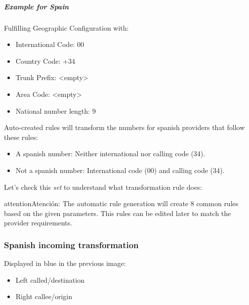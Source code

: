 \documentclass[letterpaper,10pt,spanish]{sphinxmanual}
\begin{document}
\subparagraph{Example for Spain}
\label{administration_portal/brand/settings/numeric_transformations:example-for-spain}
Fulfilling Geographic Configuration with:
\begin{itemize}
\item {} 
International Code: 00

\item {} 
Country Code: +34

\item {} 
Trunk Prefix: \textless{}empty\textgreater{}

\item {} 
Area Code: \textless{}empty\textgreater{}

\item {} 
National number length: 9

\end{itemize}

Auto-created rules will transform the numbers for spanish providers that follow these rules:
\begin{itemize}
\item {} 
A spanish number: Neither international nor calling code (34).

\item {} 
Not a spanish number: International code (00) and calling code (34).

\end{itemize}

Let's check this \emph{set} to understand what transformation rule does:

\begin{notice}{attention}{Atención:}
The automatic rule generation will create 8 common rules based on
the given parameters. This rules can be edited later to match the provider
requirements.
\end{notice}


\subsubsection{Spanish incoming transformation}
\label{administration_portal/brand/settings/numeric_transformations:spanish-incoming-transformation}
Displayed in blue in the previous image:
\begin{itemize}
\item {} 
Left called/destination

\item {} 
Right callee/origin

\end{itemize}
\end{document}
